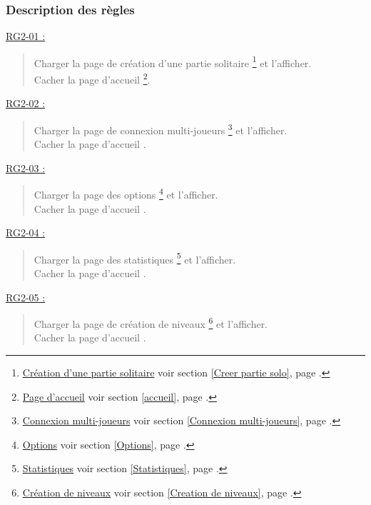 \documentclass{report}
\begin{document}
\newpage

		\subsubsection{Description des règles}
		
		\underline{RG2-01 :}
			\begin{quote}
				Charger la page de création d'une partie solitaire%
					\footnote[1]{
						\hyperlink{Creer partie solo}{Création d'une partie solitaire}
						\og voir section \ref{Creer partie solo}, page \pageref{Creer partie solo}.\fg
					}
				et l'afficher.\\
				Cacher la page d'accueil%
					\footnote[2]{
						\hyperlink{Page d'accueil}{Page d'accueil}
						\og voir section \ref{accueil}, page \pageref{accueil}.\fg
					}.\\ 
			\end{quote}


		\underline{RG2-02 :}
			\begin{quote}
				Charger la page de connexion multi-joueurs%
					\footnote[3]{
						\hyperlink{Connexion multi-joueurs}{Connexion multi-joueurs}
						\og voir section \ref{Connexion multi-joueurs}, page \pageref{Connexion multi-joueurs}.\fg
					}
				et l'afficher.\\			
				Cacher la page d'accueil%
					\footnotemark[2]
				.\\
			\end{quote}

		
		\underline{RG2-03 :}
			\begin{quote}
				Charger la page des options%
					\footnote[4]{
						\hyperlink{Options}{Options}
						\og voir section \ref{Options}, page \pageref{Options}.\fg
					}
				et l'afficher.\\			
				Cacher la page d'accueil%
					\footnotemark[2]
				.\\	
			\end{quote}


		\underline{RG2-04 :}
			\begin{quote}
				Charger la page des statistiques%
					\footnote[5]{
						\hyperlink{Statistiques}{Statistiques}
						\og voir section \ref{Statistiques}, page \pageref{Statistiques}.\fg
					}
				et l'afficher.\\				
				Cacher la page d'accueil%
					\footnotemark[2]
				.\\		
			\end{quote}


		\underline{RG2-05 :}
			\begin{quote}
				Charger la page de création de niveaux%
					\footnote[6]{
						\hyperlink{Creation de niveaux}{Création de niveaux}
						\og voir section \ref{Creation de niveaux}, page \pageref{Creation de niveaux}.\fg
					}
				et l'afficher.\\
				Cacher la page d'accueil%
					\footnotemark[2]
				.\\		
			\end{quote}
\end{document}
